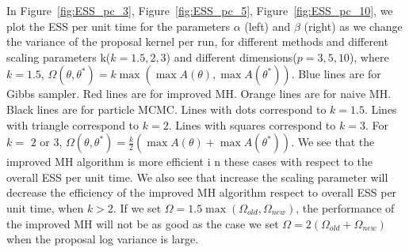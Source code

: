 

 In Figure~\ref{fig:ESS_pc_3}, Figure~\ref{fig:ESS_pc_5}, Figure~\ref{fig:ESS_pc_10}, we plot the ESS per unit time for the parameters $\alpha$ (left) and $\beta$ (right) as we change the variance of the
  proposal kernel per run, for different methods and different scaling parameters k($k = 1.5, 2, 3$) and different dimensions($p = 3, 5, 10$), where   $k = 1.5$,  $\Omega(\theta, \theta^*) = k \max(\max A(\theta), \max A(\theta^*))$. Blue lines are for Gibbs sampler. Red lines are for improved MH. Orange lines are for naive MH. Black lines are for particle MCMC. Lines with dots correspond to $k = 1.5$. Lines with triangle correspond to $k = 2$. Lines with squares correspond to $k = 3$. For $k=$ $2$ or $3$, $\Omega(\theta, \theta^*) = \frac{k}{2} (\max A(\theta) + \max A(\theta^*))$. We see that the improved MH algorithm is more efficient i	n these cases with respect to the overall ESS per unit time. We also see that increase the scaling parameter will decrease the efficiency of the improved MH algorithm respect to overall ESS per unit time, when $k > 2$. If we set $\Omega = 1.5 \max(\Omega_{old}, \Omega_{new})$, the performance of the improved MH will not be as good as the case we set $\Omega = 2(\Omega_{old} + \Omega_{new})$ when the proposal log variance is large.\\

